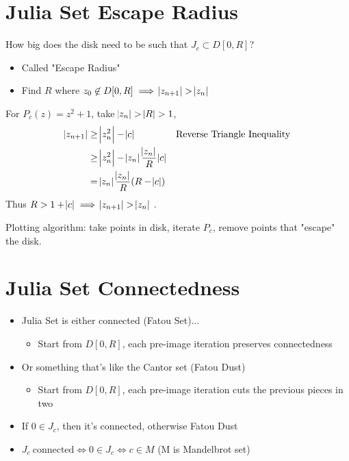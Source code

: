 \documentclass{article}
\begin{document}
\section{Julia Set Escape Radius}

How big does the disk need to be such that $J_c \subset D[0, R]$?
\begin{itemize}
    \item Called "Escape Radius"
    \item Find $R$ where $z_0 \not \in D[0, R] \implies \abs{z_{n+1}} > \abs{z_n}$
\end{itemize}

For $P_c(z) = z^2 + 1$, take $\abs{z_n} > \abs{R} > 1$,
\begin{align*}
    \abs{z_{n+1}} &\geq \abs{z_n^2} - \abs{c} &&\text{Reverse Triangle Inequality} \\
    &\geq \abs{z_n^2} - \abs{z_n}\frac{\abs{z_n}}{R}\abs{c} \\
    &= \abs{z_n}\frac{\abs{z_n}}{R}(R - \abs{c})
\end{align*}
Thus $R > 1 + \abs{c} \implies \abs{z_{n+1}} > \abs{z_n}$ \cite{JuliaEscapeRadiusProof}. 

Plotting algorithm: take points in disk, iterate $P_c$, remove points that "escape" the disk.


\section{Julia Set Connectedness}
\begin{itemize}
    \item Julia Set is either connected (Fatou Set)...
    \begin{itemize}
      \item Start from $D[0, R]$, each pre-image iteration preserves connectedness
    \end{itemize}
  
    \item Or something that's like the Cantor set (Fatou Dust)
    \begin{itemize}
      \item Start from $D[0, R]$, each pre-image iteration cuts the previous pieces in two
    \end{itemize}

    \item If $0 \in J_c$, then it's connected, otherwise Fatou Dust
    \item $J_c\ \textrm{connected} \iff 0 \in J_c \iff c \in M$ (M is Mandelbrot set)
\end{itemize}
\end{document}
